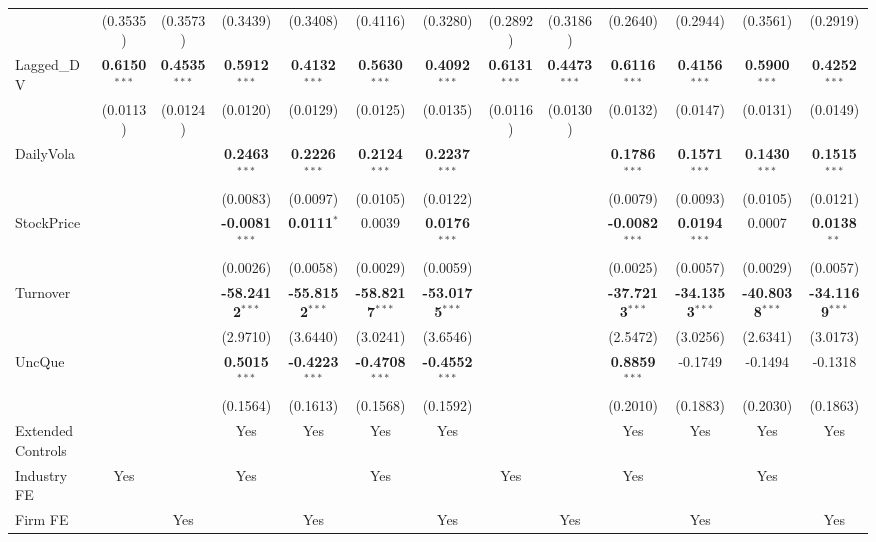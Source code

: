 \documentclass[11pt,a4paper]{article}
\begin{document}
\begin{table}[htbp]
\begin{tabular}{lcccccccccccc}
 & (0.3535) & (0.3573) & (0.3439) & (0.3408) & (0.4116) & (0.3280) & (0.2892) & (0.3186) & (0.2640) & (0.2944) & (0.3561) & (0.2919) \\
Lagged\_DV & \textbf{0.6150}$^{***}$ & \textbf{0.4535}$^{***}$ & \textbf{0.5912}$^{***}$ & \textbf{0.4132}$^{***}$ & \textbf{0.5630}$^{***}$ & \textbf{0.4092}$^{***}$ & \textbf{0.6131}$^{***}$ & \textbf{0.4473}$^{***}$ & \textbf{0.6116}$^{***}$ & \textbf{0.4156}$^{***}$ & \textbf{0.5900}$^{***}$ & \textbf{0.4252}$^{***}$ \\
 & (0.0113) & (0.0124) & (0.0120) & (0.0129) & (0.0125) & (0.0135) & (0.0116) & (0.0130) & (0.0132) & (0.0147) & (0.0131) & (0.0149) \\
DailyVola &  &  & \textbf{0.2463}$^{***}$ & \textbf{0.2226}$^{***}$ & \textbf{0.2124}$^{***}$ & \textbf{0.2237}$^{***}$ &  &  & \textbf{0.1786}$^{***}$ & \textbf{0.1571}$^{***}$ & \textbf{0.1430}$^{***}$ & \textbf{0.1515}$^{***}$ \\
 &  &  & (0.0083) & (0.0097) & (0.0105) & (0.0122) &  &  & (0.0079) & (0.0093) & (0.0105) & (0.0121) \\
StockPrice &  &  & \textbf{-0.0081}$^{***}$ & \textbf{0.0111}$^{*}$ & 0.0039 & \textbf{0.0176}$^{***}$ &  &  & \textbf{-0.0082}$^{***}$ & \textbf{0.0194}$^{***}$ & 0.0007 & \textbf{0.0138}$^{**}$ \\
 &  &  & (0.0026) & (0.0058) & (0.0029) & (0.0059) &  &  & (0.0025) & (0.0057) & (0.0029) & (0.0057) \\
Turnover &  &  & \textbf{-58.2412}$^{***}$ & \textbf{-55.8152}$^{***}$ & \textbf{-58.8217}$^{***}$ & \textbf{-53.0175}$^{***}$ &  &  & \textbf{-37.7213}$^{***}$ & \textbf{-34.1353}$^{***}$ & \textbf{-40.8038}$^{***}$ & \textbf{-34.1169}$^{***}$ \\
 &  &  & (2.9710) & (3.6440) & (3.0241) & (3.6546) &  &  & (2.5472) & (3.0256) & (2.6341) & (3.0173) \\
UncQue &  &  & \textbf{0.5015}$^{***}$ & \textbf{-0.4223}$^{***}$ & \textbf{-0.4708}$^{***}$ & \textbf{-0.4552}$^{***}$ &  &  & \textbf{0.8859}$^{***}$ & -0.1749 & -0.1494 & -0.1318 \\
 &  &  & (0.1564) & (0.1613) & (0.1568) & (0.1592) &  &  & (0.2010) & (0.1883) & (0.2030) & (0.1863) \\
\midrule
Extended Controls &  &  & Yes & Yes & Yes & Yes &  &  & Yes & Yes & Yes & Yes \\
Industry FE & Yes &  & Yes &  & Yes &  & Yes &  & Yes &  & Yes &  \\
Firm FE &  & Yes &  & Yes &  & Yes &  & Yes &  & Yes &  & Yes \\

\end{tabular}
\end{table}
\end{document}
